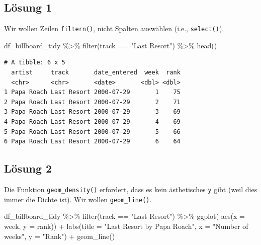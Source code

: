 \documentclass[
  letterpaper,
  DIV=11]{scrartcl}
\newenvironment{Shaded}{\begin{snugshade}}{\end{snugshade}}
\newcommand{\AttributeTok}[1]{\textcolor[rgb]{0.40,0.45,0.13}{#1}}
\newcommand{\FunctionTok}[1]{\textcolor[rgb]{0.28,0.35,0.67}{#1}}
\newcommand{\NormalTok}[1]{\textcolor[rgb]{0.00,0.23,0.31}{#1}}
\newcommand{\SpecialCharTok}[1]{\textcolor[rgb]{0.37,0.37,0.37}{#1}}
\newcommand{\StringTok}[1]{\textcolor[rgb]{0.13,0.47,0.30}{#1}}
\begin{document}
\subsection{Lösung 1}

Wir wollen Zeilen \texttt{filtern()}, nicht Spalten auswählen (i.e.,
\texttt{select()}).

\begin{Shaded}
\begin{Highlighting}[numbers=left,,]
\NormalTok{df\_billboard\_tidy }\SpecialCharTok{\%\textgreater{}\%}
  \FunctionTok{filter}\NormalTok{(track }\SpecialCharTok{==} \StringTok{"Last Resort"}\NormalTok{) }\SpecialCharTok{\%\textgreater{}\%} 
  \FunctionTok{head}\NormalTok{()}
\end{Highlighting}
\end{Shaded}

\begin{verbatim}
# A tibble: 6 x 5
  artist     track       date_entered  week  rank
  <chr>      <chr>       <date>       <dbl> <dbl>
1 Papa Roach Last Resort 2000-07-29       1    75
2 Papa Roach Last Resort 2000-07-29       2    71
3 Papa Roach Last Resort 2000-07-29       3    69
4 Papa Roach Last Resort 2000-07-29       4    69
5 Papa Roach Last Resort 2000-07-29       5    66
6 Papa Roach Last Resort 2000-07-29       6    64
\end{verbatim}

\subsection{Lösung 2}

Die Funktion \texttt{geom\_density()} erfordert, dass es kein
ästhetisches \texttt{y} gibt (weil dies immer die Dichte ist). Wir
wollen \texttt{geom\_line()}.

\begin{Shaded}
\begin{Highlighting}[numbers=left,,]
\NormalTok{df\_billboard\_tidy }\SpecialCharTok{\%\textgreater{}\%}
  \FunctionTok{filter}\NormalTok{(track }\SpecialCharTok{==} \StringTok{"Last Resort"}\NormalTok{) }\SpecialCharTok{\%\textgreater{}\%} 
\FunctionTok{ggplot}\NormalTok{(}
  \FunctionTok{aes}\NormalTok{(}\AttributeTok{x =}\NormalTok{ week, }\AttributeTok{y =}\NormalTok{ rank)) }\SpecialCharTok{+}
  \FunctionTok{labs}\NormalTok{(}\AttributeTok{title =} \StringTok{"\textquotesingle{}Last Resort\textquotesingle{} by Papa Roach"}\NormalTok{,}
       \AttributeTok{x =} \StringTok{"Number of weeks"}\NormalTok{, }\AttributeTok{y =} \StringTok{"Rank"}\NormalTok{) }\SpecialCharTok{+}
  \FunctionTok{geom\_line}\NormalTok{()}
\end{Highlighting}
\end{Shaded}
\end{document}
